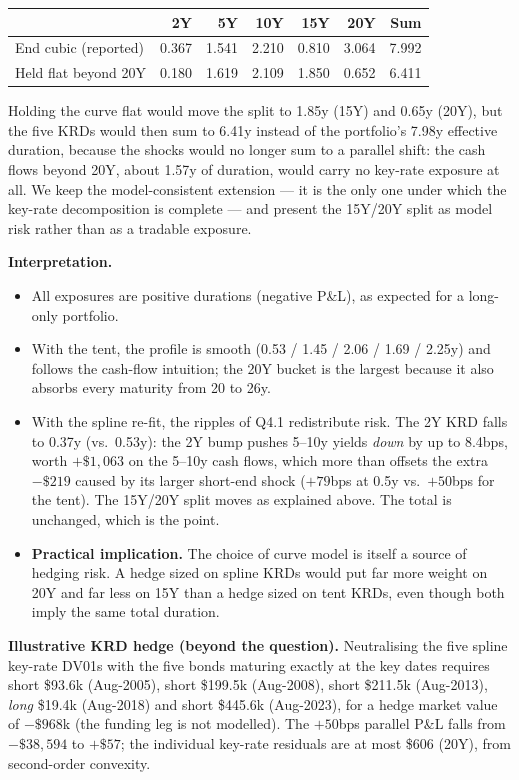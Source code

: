 \documentclass[11pt]{article}
\begin{document}
\begin{center}
\small
\begin{tabular}{lrrrrrr}
\toprule
 & 2Y & 5Y & 10Y & 15Y & 20Y & Sum \\
\midrule
End cubic (reported)  & 0.367 & 1.541 & 2.210 & 0.810 & 3.064 & 7.992 \\
Held flat beyond 20Y  & 0.180 & 1.619 & 2.109 & 1.850 & 0.652 & 6.411 \\
\bottomrule
\end{tabular}
\end{center}

Holding the curve flat would move the split to 1.85y (15Y) and 0.65y (20Y),
but the five KRDs would then sum to 6.41y instead of the portfolio's 7.98y
effective duration, because the shocks would no longer sum to a parallel
shift: the cash flows beyond 20Y, about 1.57y of duration, would carry no
key-rate exposure at all. We keep the model-consistent extension --- it is
the only one under which the key-rate decomposition is complete --- and
present the 15Y/20Y split as model risk rather than as a tradable exposure.

\textbf{Interpretation.}
\begin{itemize}[nosep]
\item All exposures are positive durations (negative P\&L), as expected for
a long-only portfolio.
\item With the tent, the profile is smooth (0.53 / 1.45 / 2.06 / 1.69 /
2.25y) and follows the cash-flow intuition; the 20Y bucket is the largest
because it also absorbs every maturity from 20 to 26y.
\item With the spline re-fit, the ripples of Q4.1 redistribute risk. The 2Y
KRD falls to 0.37y (vs.\ 0.53y): the 2Y bump pushes 5--10y yields \emph{down}
by up to 8.4bps, worth $+\$1{,}063$ on the 5--10y cash flows, which more than
offsets the extra $-\$219$ caused by its larger short-end shock ($+79$bps at
0.5y vs.\ $+50$bps for the tent). The 15Y/20Y split moves as explained above.
The total is unchanged, which is the point.
\item \textbf{Practical implication.} The choice of curve model is itself a
source of hedging risk. A hedge sized on spline KRDs would put far more
weight on 20Y and far less on 15Y than a hedge sized on tent KRDs, even
though both imply the same total duration.
\end{itemize}

\textbf{Illustrative KRD hedge (beyond the question).} Neutralising the five
spline key-rate DV01s with the five bonds maturing exactly at the key dates
requires short \$93.6k (Aug-2005), short \$199.5k (Aug-2008), short \$211.5k
(Aug-2013), \emph{long} \$19.4k (Aug-2018) and short \$445.6k (Aug-2023), for
a hedge market value of $-\$968$k (the funding leg is not modelled). The
$+50$bps parallel P\&L falls from $-\$38{,}594$ to $+\$57$; the individual
key-rate residuals are at most \$606 (20Y), from second-order convexity.
\end{document}
